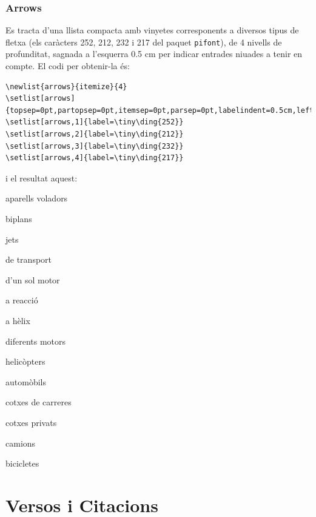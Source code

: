 \documentclass[a4paper,
                             twoside,
                             BCOR1.0cm,
                             DIV11,
                             parskip=full,
                             11pt]{scrbook}
\begin{document}
\subsubsection{Arrows}\label{ssbsec:arrows}
Es tracta d'una llista compacta amb vinyetes corresponents a diversos tipus de fletxa (els caràcters 252, 212, 232 i 217 del paquet \verb+pifont+), de 4 nivells de profunditat,  sagnada a l'esquerra 0.5 cm per indicar  entrades niuades a tenir en compte. El codi per obtenir-la és:
\begin{tiny}
\begin{verbatim}
\newlist{arrows}{itemize}{4}
\setlist[arrows]{topsep=0pt,partopsep=0pt,itemsep=0pt,parsep=0pt,labelindent=0.5cm,leftmargin=*}
\setlist[arrows,1]{label=\tiny\ding{252}}
\setlist[arrows,2]{label=\tiny\ding{212}}
\setlist[arrows,3]{label=\tiny\ding{232}}
\setlist[arrows,4]{label=\tiny\ding{217}}
\end{verbatim}
\end{tiny}
i el resultat aquest:
\begin{arrows}
\item aparells voladors
	\begin{arrows}
		\item biplans
		\item jets
		\item de transport
			\begin{arrows}
				\item d'un sol motor
					\begin{arrows}
						\item a reacció
						\item a hèlix
					\end{arrows}
				\item diferents motors
			\end{arrows}
		\item helicòpters
	\end{arrows}
\item automòbils
	\begin{arrows}
		\item cotxes de carreres
		\item cotxes privats
		\item camions
\end{arrows}
\item bicicletes
\end{arrows}

\section{Versos i Citacions}\label{sec:quote}
\end{document}
